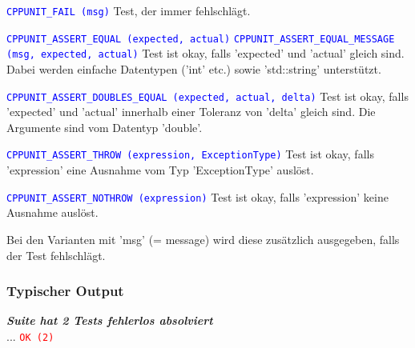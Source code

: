 \begin{multicols}{2}
\begin{minipage}{10cm}
\begin{itemize}
{    	\item \textcolor{blue}{\texttt{CPPUNIT\_FAIL (msg)}} \newline
    	Test, der immer fehlschlägt.
        
    	\item \textcolor{blue}{\texttt{CPPUNIT\_ASSERT\_EQUAL (expected, actual)}} \newline 
    	\textcolor{blue}{\texttt{CPPUNIT\_ASSERT\_EQUAL\_MESSAGE (msg, expected, actual)}} \newline 
    	Test ist okay, falls 'expected' und 'actual' gleich sind. Dabei werden \newline einfache Datentypen ('int' etc.) sowie 'std::string' unterstützt.
        
    	\item \textcolor{blue}{\texttt{CPPUNIT\_ASSERT\_DOUBLES\_EQUAL (expected, actual, delta)}} \newline Test ist okay, falls 'expected' und 'actual' innerhalb einer Toleranz von \newline 'delta' gleich sind. Die Argumente sind vom Datentyp 'double'.
        
    	\item \textcolor{blue}{\texttt{CPPUNIT\_ASSERT\_THROW (expression, ExceptionType)}} \newline Test ist okay, falls 'expression' eine Ausnahme vom Typ 'ExceptionType' auslöst.
        
    	\item \textcolor{blue}{\texttt{CPPUNIT\_ASSERT\_NOTHROW (expression)}} \newline 
    	Test ist okay, falls 'expression' keine Ausnahme auslöst.
        
    	\item Bei den Varianten mit 'msg' (= message) wird diese zusätzlich \newline ausgegeben, falls der Test fehlschlägt.}
    \end{itemize}
\end{minipage}
\subsubsection{Typischer Output}
\hspace{0.5cm}
\begin{minipage}{10cm}
\footnotesize{
        \textbf{\textit{Suite hat 2 Tests fehlerlos absolviert}}\\
        ...\newline
        \textcolor{red}{\texttt{OK (2)}}\\\\
        
}
\end{minipage}
\end{multicols}
